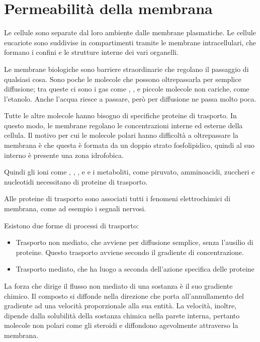 \chapter{Permeabilità della membrana}




Le cellule sono separate dal loro ambiente dalle membrane plasmatiche. Le cellule eucariote sono suddivise in compartimenti tramite le membrane intracellulari, che formano i confini e le strutture interne dei vari organelli.

Le membrane biologiche sono barriere straordinarie che regolano il passaggio di qualsiasi cosa. Sono poche le molecole che possono oltrepassarla per semplice diffusione; tra queste ci sono i gas come , ,  e piccole molecole non cariche, come l'etanolo. Anche l'acqua riesce a passare, però per diffusione ne passa molto poca.

Tutte le altre molecole hanno bisogno di specifiche proteine di trasporto. In questo modo, le membrane regolano le concentrazioni interne ed esterne della cellula. Il motivo per cui le molecole polari hanno difficoltà a oltrepassare la membrana è che questa è formata da un doppio strato fosfolipidico, quindi al suo interno è presente una zona idrofobica.

Quindi gli ioni come , , ,  e  e i metaboliti, come piruvato, amminoacidi, zuccheri e nucleotidi necessitano di proteine di trasporto.

Alle proteine di trasporto sono associati tutti i fenomeni elettrochimici di membrana, come ad esempio i segnali nervosi.

Esistono due forme di processi di trasporto:
\begin{itemize}
\item Trasporto non mediato, che avviene per diffusione semplice, senza l'ausilio di proteine. Questo trasporto avviene secondo il gradiente di concentrazione.
\item Trasporto mediato, che ha luogo a seconda dell'azione specifica delle proteine
\end{itemize}

La forza che dirige il flusso non mediato di una sostanza è il suo gradiente chimico. Il composto si diffonde nella direzione che porta all'annullamento del gradiente ad una velocità proporzionale alla sua entità. La velocità, inoltre, dipende dalla solubilità della sostanza chimica nella parete interna, pertanto molecole non polari come gli steroidi e  diffondono agevolmente attraverso la membrana.

